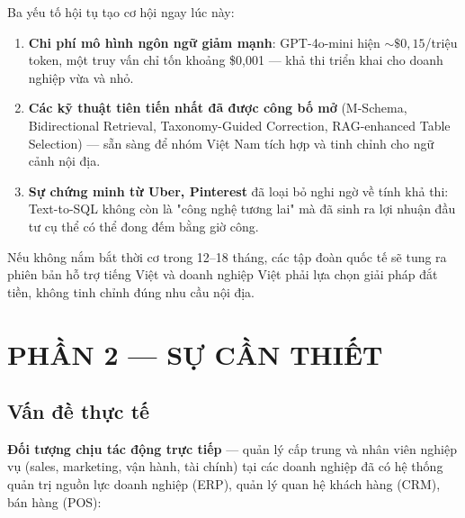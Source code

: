 \documentclass[11pt,a4paper]{article}
\begin{document}
Ba yếu tố hội tụ tạo cơ hội ngay lúc này:

\begin{enumerate}
\item \textbf{Chi phí mô hình ngôn ngữ giảm mạnh}: GPT-4o-mini hiện $\sim\$0{,}15$/triệu token, một truy vấn chỉ tốn khoảng \$0{,}001 --- khả thi triển khai cho doanh nghiệp vừa và nhỏ.
\item \textbf{Các kỹ thuật tiên tiến nhất đã được công bố mở} (M-Schema, Bidirectional Retrieval, Taxonomy-Guided Correction, RAG-enhanced Table Selection) --- sẵn sàng để nhóm Việt Nam tích hợp và tinh chỉnh cho ngữ cảnh nội địa.
\item \textbf{Sự chứng minh từ Uber, Pinterest} đã loại bỏ nghi ngờ về tính khả thi: Text-to-SQL không còn là "công nghệ tương lai" mà đã sinh ra lợi nhuận đầu tư cụ thể có thể đong đếm bằng giờ công.
\end{enumerate}

Nếu không nắm bắt thời cơ trong 12--18 tháng, các tập đoàn quốc tế sẽ tung ra phiên bản hỗ trợ tiếng Việt và doanh nghiệp Việt phải lựa chọn giải pháp đắt tiền, không tinh chỉnh đúng nhu cầu nội địa.

\newpage
\section{PHẦN 2 --- SỰ CẦN THIẾT}

\subsection{Vấn đề thực tế}

\textbf{Đối tượng chịu tác động trực tiếp} --- quản lý cấp trung và nhân viên nghiệp vụ (sales, marketing, vận hành, tài chính) tại các doanh nghiệp đã có hệ thống quản trị nguồn lực doanh nghiệp (ERP), quản lý quan hệ khách hàng (CRM), bán hàng (POS):
\end{document}
